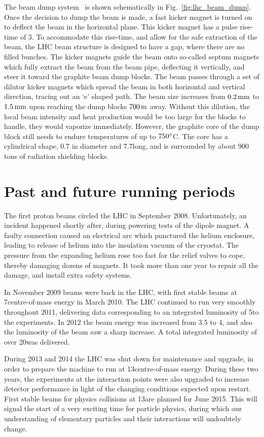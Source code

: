 The beam dump system~\cite{Schmidt:2006mi} is shown schematically in Fig.~\ref{fig:lhc_beam_dump}. 
Once the decision to dump the beam is made, a fast kicker magnet is turned on to deflect the beam
in the horizontal plane. 
This kicker magnet has a pulse rise-time of 3\mus. To accommodate this rise-time, and allow for
the safe extraction of the beam, the LHC beam structure is designed to have a gap, where there are
no filled bunches.
The kicker magnets guide the beam onto so-called septum magnets which fully extract the beam from
the beam pipe, deflecting it vertically, and steer it toward the graphite beam dump blocks. The
beam passes through a set of dilutor kicker magnets which spread the beam in both horizontal and
vertical direction, tracing out an `e' shaped path. 
The beam size increases from $0.2\mm$ to $1.5\mm$ upon reaching the dump blocks $700\meter$ away.
Without this dilution, the local beam intensity and heat production would be too large for the
blocks to handle, they would vaporize immediately. However, the graphite core of the dump block
still needs to endure temperatures of up to $750\de$C. The core has a cylindrical shape, 0.7\meter
in diameter and 7.7\meter long, and is surrounded by about 900 tons of radiation shielding blocks.


\section{Past and future running periods}

The first proton beams circled the LHC in September 2008. Unfortunately, an incident happened
shortly after, during powering tests of the dipole magnet. A faulty connection caused  an electrical
arc which punctured the helium enclosure, leading to release of helium into the insulation vacuum of
the cryostat. The pressure from the expanding helium rose too fast for the relief valves to cope,
thereby damaging dozens of magnets. It took more than one year to repair all the damage, and
install extra safety systems. 

In November 2009 beams were back in the LHC, with first stable beams
at 7\TeV centre-of-mass energy in March 2010. The LHC continued to run very smoothly throughout
2011, delivering data corresponding to an integrated luminosity of 5\fbinv to the experiments.  
In 2012 the beam energy was increased from 3.5 to 4\TeV, and also the luminosity of the beam saw a
sharp increase. A total integrated luminosity of over 20\fbinv was delivered. 

During 2013 and 2014 the LHC was shut down for maintenance and upgrade, in order to prepare the
machine to run at 13\TeV centre-of-mass energy. During these two years, the experiments at the
interaction points were also upgraded to increase detector performance in light of the changing
conditions expected upon restart. 
First stable beams for physics collisions at 13\TeV are planned for June 2015. This will signal the
start of a very exciting time for particle physics, during which our understanding of elementary
particles and their interactions will undoubtely change. 


